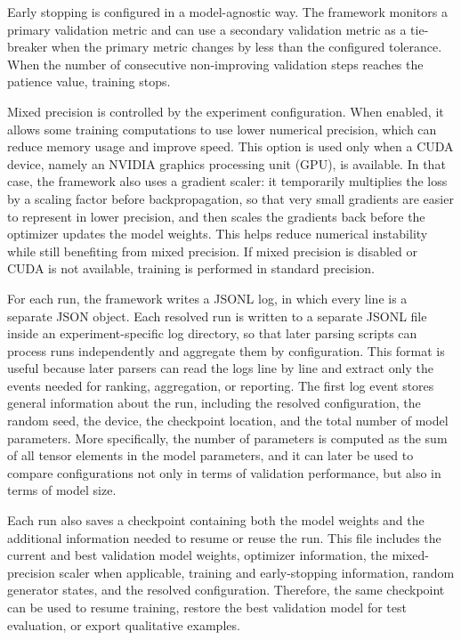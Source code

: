 Early stopping is configured in a model-agnostic way. The framework monitors a primary validation metric and can use a secondary validation metric as a tie-breaker when the primary metric changes by less than the configured tolerance. When the number of consecutive non-improving validation steps reaches the patience value, training stops.

Mixed precision is controlled by the experiment configuration. When enabled, it allows some training computations to use lower numerical precision, which can reduce memory usage and improve speed. This option is used only when a CUDA device, namely an NVIDIA graphics processing unit (GPU), is available. In that case, the framework also uses a gradient scaler: it temporarily multiplies the loss by a scaling factor before backpropagation, so that very small gradients are easier to represent in lower precision, and then scales the gradients back before the optimizer updates the model weights. This helps reduce numerical instability while still benefiting from mixed precision. If mixed precision is disabled or CUDA is not available, training is performed in standard precision.

For each run, the framework writes a JSONL log, in which every line is a separate JSON object. Each resolved run is written to a separate JSONL file inside an experiment-specific log directory, so that later parsing scripts can process runs independently and aggregate them by configuration. This format is useful because later parsers can read the logs line by line and extract only the events needed for ranking, aggregation, or reporting. The first log event stores general information about the run, including the resolved configuration, the random seed, the device, the checkpoint location, and the total number of model parameters. More specifically, the number of parameters is computed as the sum of all tensor elements in the model parameters, and it can later be used to compare configurations not only in terms of validation performance, but also in terms of model size.

Each run also saves a checkpoint containing both the model weights and the additional information needed to resume or reuse the run. This file includes the current and best validation model weights, optimizer information, the mixed-precision scaler when applicable, training and early-stopping information, random generator states, and the resolved configuration. Therefore, the same checkpoint can be used to resume training, restore the best validation model for test evaluation, or export qualitative examples.

